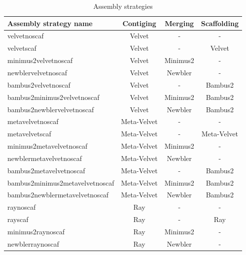 \documentclass[a4paper,12pt]{report}
\begin{document}
\begin{table}[h!]
\centering
\begin{tabular}{|l|c|c|c|}
\hline
Assembly strategy name & Contiging & Merging & Scaffolding\\
\hline
velvetnoscaf & Velvet & - & -\\
velvetscaf & Velvet & - & Velvet\\
minimus2velvetnoscaf & Velvet & Minimus2 & -\\
newblervelvetnoscaf & Velvet & Newbler & -\\
bambus2velvetnoscaf & Velvet & - & Bambus2\\
bambus2minimus2velvetnoscaf & Velvet & Minimus2 & Bambus2\\
bambus2newblervelvetnoscaf & Velvet & Newbler & Bambus2\\
metavelvetnoscaf & Meta-Velvet & - & -\\
metavelvetscaf & Meta-Velvet & - & Meta-Velvet\\
minimus2metavelvetnoscaf & Meta-Velvet & Minimus2 & -\\
newblermetavelvetnoscaf & Meta-Velvet & Newbler & -\\
bambus2metavelvetnoscaf & Meta-Velvet & - & Bambus2\\
bambus2minimus2metavelvetnoscaf & Meta-Velvet & Minimus2 & Bambus2\\
bambus2newblermetavelvetnoscaf & Meta-Velvet & Newbler & Bambus2\\
raynoscaf & Ray & - & -\\
rayscaf & Ray & - & Ray\\
minimus2raynoscaf & Ray & Minimus2 & -\\
newblerraynoscaf & Ray & Newbler & -\\
\hline
\end{tabular}
\caption{Assembly strategies}
\label{tab:asmstrat}
\end{table}
\end{document}
